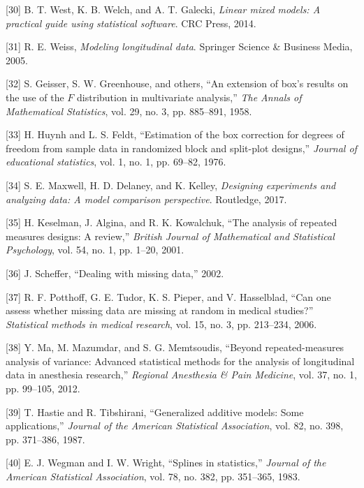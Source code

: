 \documentclass[
]{article}
\begin{document}
\leavevmode\hypertarget{ref-west2014}{}%
{[}30{]} B. T. West, K. B. Welch, and A. T. Galecki, \emph{Linear mixed models: A practical guide using statistical software}. CRC Press, 2014.

\leavevmode\hypertarget{ref-weiss2005}{}%
{[}31{]} R. E. Weiss, \emph{Modeling longitudinal data}. Springer Science \& Business Media, 2005.

\leavevmode\hypertarget{ref-geisser1958}{}%
{[}32{]} S. Geisser, S. W. Greenhouse, and others, ``An extension of box's results on the use of the \(F\) distribution in multivariate analysis,'' \emph{The Annals of Mathematical Statistics}, vol. 29, no. 3, pp. 885--891, 1958.

\leavevmode\hypertarget{ref-huynh1976}{}%
{[}33{]} H. Huynh and L. S. Feldt, ``Estimation of the box correction for degrees of freedom from sample data in randomized block and split-plot designs,'' \emph{Journal of educational statistics}, vol. 1, no. 1, pp. 69--82, 1976.

\leavevmode\hypertarget{ref-maxwell2017}{}%
{[}34{]} S. E. Maxwell, H. D. Delaney, and K. Kelley, \emph{Designing experiments and analyzing data: A model comparison perspective}. Routledge, 2017.

\leavevmode\hypertarget{ref-keselman2001}{}%
{[}35{]} H. Keselman, J. Algina, and R. K. Kowalchuk, ``The analysis of repeated measures designs: A review,'' \emph{British Journal of Mathematical and Statistical Psychology}, vol. 54, no. 1, pp. 1--20, 2001.

\leavevmode\hypertarget{ref-scheffer2002}{}%
{[}36{]} J. Scheffer, ``Dealing with missing data,'' 2002.

\leavevmode\hypertarget{ref-potthoff2006}{}%
{[}37{]} R. F. Potthoff, G. E. Tudor, K. S. Pieper, and V. Hasselblad, ``Can one assess whether missing data are missing at random in medical studies?'' \emph{Statistical methods in medical research}, vol. 15, no. 3, pp. 213--234, 2006.

\leavevmode\hypertarget{ref-ma2012}{}%
{[}38{]} Y. Ma, M. Mazumdar, and S. G. Memtsoudis, ``Beyond repeated-measures analysis of variance: Advanced statistical methods for the analysis of longitudinal data in anesthesia research,'' \emph{Regional Anesthesia \& Pain Medicine}, vol. 37, no. 1, pp. 99--105, 2012.

\leavevmode\hypertarget{ref-hastie1987}{}%
{[}39{]} T. Hastie and R. Tibshirani, ``Generalized additive models: Some applications,'' \emph{Journal of the American Statistical Association}, vol. 82, no. 398, pp. 371--386, 1987.

\leavevmode\hypertarget{ref-wegman1983}{}%
{[}40{]} E. J. Wegman and I. W. Wright, ``Splines in statistics,'' \emph{Journal of the American Statistical Association}, vol. 78, no. 382, pp. 351--365, 1983.
\end{document}
